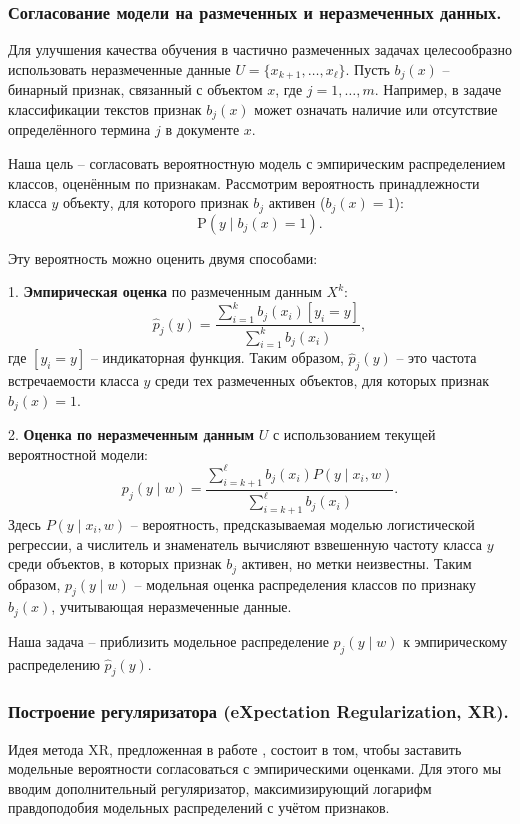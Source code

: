 \subsubsection*{Согласование модели на размеченных и неразмеченных данных.}

Для улучшения качества обучения в частично размеченных задачах целесообразно использовать неразмеченные данные $U = \{x_{k+1}, \ldots, x_{\ell}\}$. Пусть $b_j(x)$ – бинарный признак, связанный с объектом $x$, где $j = 1, \ldots, m$. Например, в задаче классификации текстов признак $b_j(x)$ может означать наличие или отсутствие определённого термина $j$ в документе $x$. 

Наша цель – согласовать вероятностную модель с эмпирическим распределением классов, оценённым по признакам. Рассмотрим вероятность принадлежности класса $y$ объекту, для которого признак $b_j$ активен ($b_j(x)=1$):
\[
\mathrm{P}(y \mid b_j(x)=1).
\]

Эту вероятность можно оценить двумя способами:

1. \textbf{Эмпирическая оценка} по размеченным данным $X^k$:
\[
\hat{p}_j(y) = \frac{\sum_{i=1}^k b_j(x_i)[y_i = y]}{\sum_{i=1}^k b_j(x_i)},
\]
где $[y_i = y]$ – индикаторная функция. Таким образом, $\hat{p}_j(y)$ – это частота встречаемости класса $y$ среди тех размеченных объектов, для которых признак $b_j(x)=1$.

2. \textbf{Оценка по неразмеченным данным} $U$ с использованием текущей вероятностной модели:
\[
p_j(y \mid w) = \frac{\sum_{i=k+1}^{\ell} b_j(x_i) P(y \mid x_i, w)}{\sum_{i=k+1}^{\ell} b_j(x_i)}.
\]
Здесь $P(y \mid x_i, w)$ – вероятность, предсказываемая моделью логистической регрессии, а числитель и знаменатель вычисляют взвешенную частоту класса $y$ среди объектов, в которых признак $b_j$ активен, но метки неизвестны. Таким образом, $p_j(y \mid w)$ – модельная оценка распределения классов по признаку $b_j(x)$, учитывающая неразмеченные данные.

Наша задача – приблизить модельное распределение $p_j(y \mid w)$ к эмпирическому распределению $\hat{p}_j(y)$.

\subsubsection*{Построение регуляризатора (eXpectation Regularization, XR).}

Идея метода XR, предложенная в работе \cite{mann2007simple}, состоит в том, чтобы заставить модельные вероятности согласоваться с эмпирическими оценками. Для этого мы вводим дополнительный регуляризатор, максимизирующий логарифм правдоподобия модельных распределений с учётом признаков.

